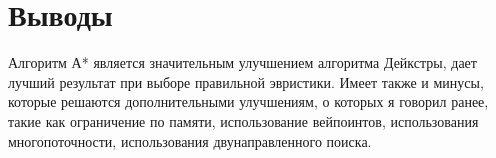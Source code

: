 \section{Выводы}

Алгоритм А* является значительным улучшением алгоритма Дейкстры, дает лучший результат при выборе правильной эвристики. Имеет также и минусы, которые решаются дополнительными улучшениям, о которых я говорил ранее, такие как ограничение по памяти, использование вейпоинтов, использования многопоточности, использования двунаправленного поиска.

\pagebreak